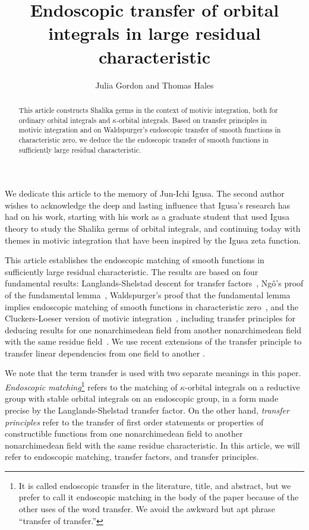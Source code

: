 \documentclass[12pt]{amsart}
\title{Endoscopic transfer of orbital integrals in large residual characteristic}
\author{Julia Gordon and Thomas Hales}
\theoremstyle{plain}
\theoremstyle{definition}
\begin{document}
\begin{abstract} This article constructs Shalika germs in the context
  of motivic integration, both for ordinary orbital integrals and
  $\kappa$-orbital integrals.  Based on transfer principles in motivic
  integration and on Waldspurger's endoscopic transfer of smooth
  functions in characteristic zero, we deduce the the endoscopic
  transfer of smooth functions in sufficiently large residual
  characteristic.
\end{abstract}



\maketitle
\linenumbers


We dedicate this article to the memory of Jun-Ichi Igusa.  The second
author wishes to acknowledge the deep and lasting influence that
Igusa's research has had on his work, starting with his work as a
graduate student that used Igusa theory to study the Shalika germs of
orbital integrals, and continuing today with themes in motivic
integration that have been inspired by the Igusa zeta function.

\bigskip

This article establishes the endoscopic matching of smooth functions
in sufficiently large residual characteristic.  The results are based
on four fundamental results: Langlands-Shelstad descent for transfer
factors~\cite{LSxf}, Ng\^o's proof of the fundamental
lemma~\cite{ngo2010lemme}, Waldspurger's proof that the fundamental lemma
implies endoscopic matching of smooth functions in characteristic
zero~\cite{waldspurger1997lemme}, and the Cluckers-Loeser version of motivic
integration~\cite{CL}, including transfer principles for deducing
results for one nonarchimedean field from another nonarchimedean field
with the same residue field~\cite{CLe}.  We use recent extensions of
the transfer principle to transfer linear dependencies from one field
to another \cite{CGH2}.

We note that the term transfer is used with two separate meanings in
this paper.  {\it Endoscopic matching}\footnote{It is called
  endoscopic transfer in the literature, title, and abstract, but we
  prefer to call it endoscopic matching in the body of the paper
  because of the other uses of the word transfer. We avoid the awkward
  but apt phrase ``transfer of transfer.''}  refers to the matching of
$\kappa$-orbital integrals on a reductive group with stable orbital
integrals on an endoscopic group, in a form made precise by the
Langlands-Shelstad transfer factor.  On the other hand, {\it transfer
  principles} refer to the transfer of first order statements or
properties of constructible functions from one nonarchimedean field to
another nonarchimedean field with the same residue characteristic.  In
this article, we will refer to endoscopic matching, transfer factors,
and transfer principles.
\end{document}
